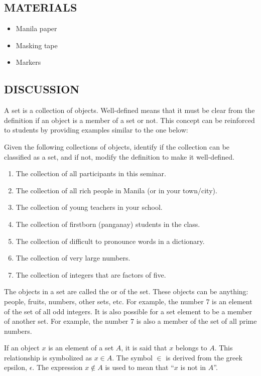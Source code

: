 \subsection*{MATERIALS}
\begin{itemize}
\item Manila paper
\item Masking tape
\item Markers
\end{itemize}

\subsection*{DISCUSSION}
A set is a  collection of objects. Well-defined means that it must be clear from the definition if an object is a member of a set or not. This concept can be reinforced to students by providing examples similar to the one below:

Given the following collections of objects, identify if the collection can be classified as a set, and if not, modify the definition to make it well-defined.
\begin{enumerate}
\item The collection of all participants in this seminar.
\item  The collection of all rich people in Manila (or in your town/city).
\item The collection of young teachers in your school.
\item The collection of firstborn (panganay) students in the class.
\item The collection of difficult to pronounce words in a dictionary.
\item The collection of very large numbers.
\item The collection of integers that are factors of five.
\end{enumerate}
The objects in a set are called the  or  of the set. These objects can be anything: people, fruits, numbers, other sets, etc. For example, the number 7 is an element of the set of all odd integers. It is also possible for a set element to be a member of another set. For example, the number 7 is also a member of the set of all prime numbers.

If an object $x$ is an element of a set $A$, it is said that $x$ belongs to $A$. This relationship is symbolized as $x\in A$. The symbol $\in$ is derived from the greek epsilon, $\epsilon$. The expression $x\notin A$ is used to mean that “$x$ is not in $A$”.

